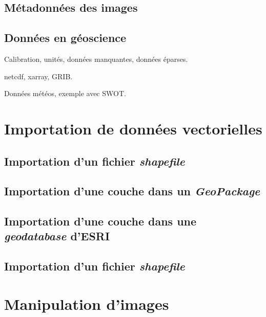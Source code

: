 \documentclass[
  letterpaper,
  DIV=11,
  numbers=noendperiod]{scrreprt}
\begin{document}
\subsection{Métadonnées des images}\label{sec-0113}

\subsection{Données en géoscience}\label{sec-0114}

Calibration, unités, données manquantes, données éparses.

netcdf, xarray, GRIB.

Données météos, exemple avec SWOT.

\section{Importation de données vectorielles}\label{sec-012}

\subsection{\texorpdfstring{Importation d'un fichier
\emph{shapefile}}{Importation d'un fichier shapefile}}\label{sec-0121}

\subsection{\texorpdfstring{Importation d'une couche dans un
\emph{GeoPackage}}{Importation d'une couche dans un GeoPackage}}\label{sec-0122}

\subsection{\texorpdfstring{Importation d'une couche dans une
\emph{geodatabase}
d'ESRI}{Importation d'une couche dans une geodatabase d'ESRI}}\label{sec-0123}

\subsection{\texorpdfstring{Importation d'un fichier
\emph{shapefile}}{Importation d'un fichier shapefile}}\label{sec-0124}

\section{Manipulation d'images}\label{sec-013}
\end{document}
